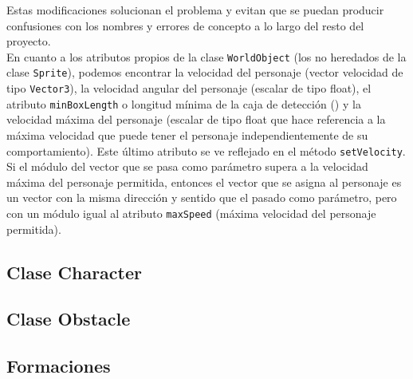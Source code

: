 Estas modificaciones solucionan el problema y evitan que se puedan producir confusiones con los nombres y errores de concepto a lo largo del resto del proyecto. \\

En cuanto a los atributos propios de la clase \texttt{WorldObject} (los no heredados de la clase \texttt{Sprite}), podemos encontrar la velocidad del personaje (vector velocidad de tipo \texttt{Vector3}), la velocidad angular del personaje (escalar de tipo float), el atributo \texttt{minBoxLength} o longitud mínima de la caja de detección () y la velocidad máxima del personaje (escalar de tipo float que hace referencia a la máxima velocidad que puede tener el personaje independientemente de su comportamiento). Este último atributo se ve reflejado en el método \texttt{setVelocity}. Si el módulo del vector que se pasa como parámetro supera a la velocidad máxima del personaje permitida, entonces el vector que se asigna al personaje es un vector con la misma dirección y sentido que el pasado como parámetro, pero con un módulo igual al atributo \texttt{maxSpeed} (máxima velocidad del personaje permitida). \\
 

\subsection{Clase Character}

\subsection{Clase Obstacle}

\subsection{Formaciones}